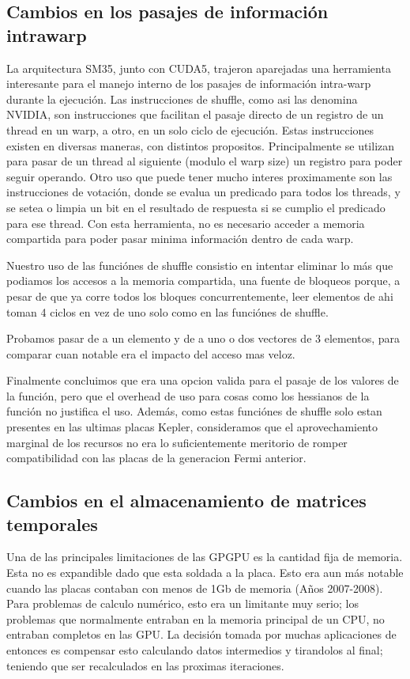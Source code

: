 \subsection{Cambios en los pasajes de informaci\'on intrawarp}
La arquitectura SM35, junto con CUDA5, trajeron aparejadas una herramienta interesante
para el manejo interno de los pasajes de informaci\'on intra-warp durante la ejecuci\'on.
Las instrucciones de shuffle, como asi las denomina NVIDIA, son instrucciones que facilitan
el pasaje directo de un registro de un thread en un warp, a otro, en un solo ciclo de ejecuci\'on.
Estas instrucciones existen en diversas maneras, con distintos propositos. Principalmente se
utilizan para pasar de un thread al siguiente (modulo el warp size) un registro para poder seguir
operando. Otro uso que puede tener mucho interes proximamente son las instrucciones de votaci\'on,
donde se evalua un predicado para todos los threads, y se setea o limpia un bit en el resultado
de respuesta si se cumplio el predicado para ese thread. Con esta herramienta, no es necesario
acceder a memoria compartida para poder pasar minima informaci\'on dentro de cada warp.

Nuestro uso de las funci\'ones de shuffle consistio en intentar eliminar lo m\'as que podiamos
los accesos a la memoria compartida, una fuente de bloqueos porque, a pesar de que ya corre
todos los bloques concurrentemente, leer elementos de ahi toman 4 ciclos en vez de uno solo
como en las funci\'ones de shuffle.

Probamos pasar de a un elemento y de a uno o dos vectores de 3 elementos, para comparar
cuan notable era el impacto del acceso mas veloz.

Finalmente concluimos que era una opcion valida para el pasaje de los valores de la funci\'on,
pero que el overhead de uso para cosas como los hessianos de la funci\'on no justifica el uso.
Adem\'as, como estas funci\'ones de shuffle solo estan presentes en las ultimas placas Kepler,
consideramos que el aprovechamiento marginal de los recursos no era lo suficientemente meritorio
de romper compatibilidad con las placas de la generacion Fermi anterior.


\subsection{Cambios en el almacenamiento de matrices temporales}
Una de las principales limitaciones de las GPGPU es la cantidad fija de memoria. Esta no es
expandible dado que esta soldada a la placa. Esto era aun m\'as notable cuando las placas
contaban con menos de 1Gb de memoria (A\~nos 2007-2008).
Para problemas de calculo num\'erico, esto era un limitante muy serio; los problemas que
normalmente entraban en la memoria principal de un CPU, no entraban completos en las GPU.
La decisi\'on tomada por muchas aplicaciones de entonces es compensar esto calculando
datos intermedios y tirandolos al final; teniendo que ser recalculados en las proximas iteraciones.

